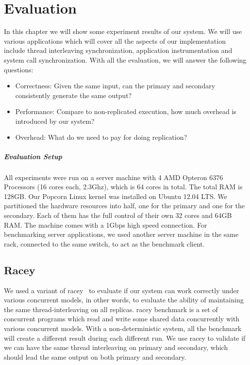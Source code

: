 \chapter{Evaluation}

In this chapter we will show some experiment results of our system. We will use various applications which will cover all the aspects of our implementation include thread interleaving synchronization, application instrumentation and system call synchronization. With all the evaluation, we will answer the following questions:

\begin{itemize}
  \item Correctness: Given the same input, can the primary and secondary consistently generate the same output?
  \item Performance: Compare to non-replicated execution, how much overhead is introduced by our system?
  \item Overhead: What do we need to pay for doing replication?
\end{itemize}

\paragraph{Evaluation Setup} All experiments were run on a server machine with 4 AMD Opteron 6376 Processors (16 cores each, 2.3Ghz), which is 64 cores in total. The total RAM is 128GB. Our Popcorn Linux kernel was installed on Ubuntu 12.04 LTS. We partitioned the hardware resources into half, one for the primary and one for the secondary. Each of them has the full control of their own 32 cores and 64GB RAM. The machine comes with a 1Gbps high speed connection. For benchmarking server applications, we used another server machine in the same rack, connected to the same switch, to act as the benchmark client.

\section{Racey}
We used a variant of racey~\cite{hillstress} to evaluate if our system can work correctly under various concurrent models, in other words, to evaluate the ability of maintaining the same thread-interleaving on all replicas. racey benchmark is a set of concurrent programs which read and write some shared data concurrently with various concurrent models. With a non-deterministic system, all the benchmark will create a different result during each different run. We use racey to validate if we can have the same thread interleaving on primary and secondary, which should lead the same output on both primary and secondary.

